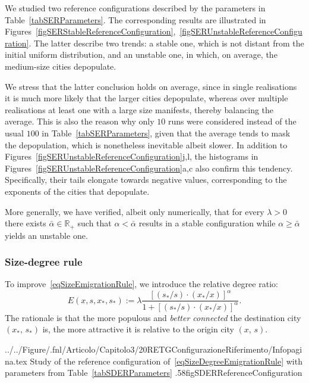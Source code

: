\documentclass[a4paper]{article}
\newcommand{\R}{\mathbb{R}}
\begin{document}
We studied two reference configurations described by the parameters in Table~\ref{tabSERParameters}. The corresponding results are illustrated in Figures~\ref{figSERStableReferenceConfiguration},~\ref{figSERUnstableReferenceConfiguration}. The latter describe two trends: a stable one, which is not distant from the initial uniform distribution, and an unstable one, in which, on average, the medium-size cities depopulate.

We stress that the latter conclusion holds on average, since in single realisations it is much more likely that the larger cities depopulate, whereas over multiple realisations at least one with a large size manifests, thereby balancing the average. This is also the reason why only $10$ runs were considered instead of the usual $100$ in Table~\ref{tabSERParameters}, given that the average tends to mask the depopulation, which is nonetheless inevitable albeit slower. In addition to Figures~\ref{figSERUnstableReferenceConfiguration}j,l, the histograms in Figures~\ref{figSERUnstableReferenceConfiguration}a,c also confirm this tendency. Specifically, their tails elongate towards negative values, corresponding to the exponents of the cities that depopulate.
    
More generally, we have verified, albeit only numerically, that for every $\lambda>0$ there exists $\bar\alpha\in\R_+$ such that $\alpha<\bar\alpha$ results in a stable configuration while $\alpha\geq\bar\alpha$ yields an unstable one.

\subsubsection{Size-degree rule}
\label{secSDER}
%
To improve~\eqref{eqSizeEmigrationRule}, we introduce the relative degree ratio:
\begin{equation}
    E(x,s,x_\ast,s_*):=\lambda\frac{\left[\left(s_\ast/s\right)\cdot \left(x_\ast/x\right)\right]^\alpha}{1+\left[\left(s_\ast/s\right)\cdot \left(x_\ast/x\right)\right]^\alpha}.
    \label{eqSizeDegreeEmigrationRule}
\end{equation}
The rationale is that the more populous and \textit{better connected} the destination city $(x_\ast,\,s_\ast)$ is, the more attractive it is relative to the origin city $(x,\,s)$.

  {../../Figure/.fnl/Articolo/Capitolo3/20RETGConfigurazioneRiferimento/Infopagina.tex}
  {Study of the reference configuration of~\eqref{eqSizeDegreeEmigrationRule} with parameters from Table~\ref{tabSDERParameters}}
  {.58\linewidth}{figSDERReferenceConfiguration}
\end{document}
